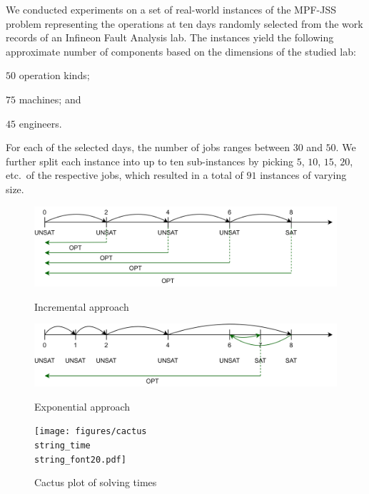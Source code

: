 \documentclass[submission,copyright,creativecommons]{eptcs}
\newcommand{\jss}{MPF-JSS\xspace}
\begin{document}
We conducted experiments on a set of real-world instances of the \jss problem 
representing the operations at ten days randomly selected from the work
records of an Infineon Fault Analysis lab.
%
The instances yield the following approximate number of components based on the dimensions of the studied lab:
\begin{enumerate*}[label=\emph{(\roman*)}]
	\item $50$ operation kinds;
	\item $75$ machines; and 
	\item $45$ engineers.
\end{enumerate*}
For each of the selected days, the number of jobs ranges between $30$ and $50$.
We further split each instance into up to ten sub-instances by picking
$5$, $10$, $15$, $20$, etc.\ of the respective jobs,
which resulted in a total of $91$ instances of varying size. %
%
\begin{figure}
	\begin{minipage}[b]{.5\textwidth}
		\includegraphics[width=\linewidth]{figures/incremental.pdf}
		\caption{Incremental approach \label{fig:inc}}
			\smallskip %
			\bigskip
		\includegraphics[width=\linewidth]{figures/exponential.pdf}
		\caption{Exponential approach \label{fig:exp}}
	\end{minipage}%
	\begin{minipage}[b]{.5\textwidth}
		\texttt{[image: figures/cactus\\string\_time\\string\_font20.pdf]}
		\caption{Cactus plot of solving times \label{fig:cactus:time}}
	\end{minipage}
\end{figure}
\end{document}
